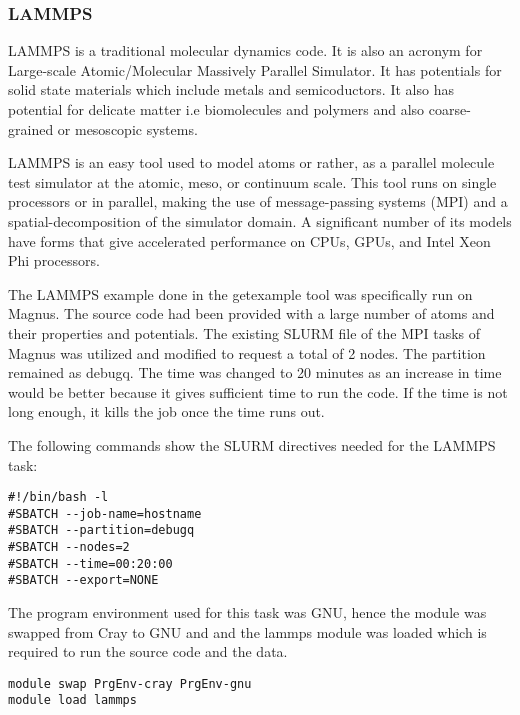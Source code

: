 \subsubsection{LAMMPS}

LAMMPS is a traditional molecular dynamics code. It is also an acronym for Large-scale Atomic/Molecular Massively Parallel Simulator. It has potentials
for solid state materials which include metals and semicoductors. It also has potential for delicate matter i.e biomolecules and polymers and also
coarse-grained or mesoscopic systems.

LAMMPS is an easy tool used to model atoms or rather, as a parallel molecule test simulator at the atomic, meso, or continuum scale. This tool runs on
single processors or in parallel, making the use of message-passing systems (MPI) and a spatial-decomposition of the simulator domain. A significant
number of its models have forms that give accelerated performance on CPUs, GPUs, and Intel Xeon Phi processors.

The LAMMPS example done in the getexample tool was specifically run on Magnus. The source code had been provided with a large number of atoms and their
properties and potentials. The existing SLURM file of the MPI tasks of Magnus was utilized and modified to request a total of 2 nodes. The partition
remained as debugq. The time was changed to 20 minutes as an increase in time would be better because it gives sufficient time to run the code. If the 
time is not long enough, it kills the job once the time runs out.

The following commands show the SLURM directives needed for the LAMMPS task:

\begin{tcolorbox}
\begin{Verbatim}[fontsize=\scriptsize]
#!/bin/bash -l
#SBATCH --job-name=hostname
#SBATCH --partition=debugq
#SBATCH --nodes=2
#SBATCH --time=00:20:00
#SBATCH --export=NONE
\end{Verbatim}
\end{tcolorbox}

The program environment used for this task was GNU, hence the module was swapped from Cray to GNU and and the lammps module was loaded which is required
to run the source code and the data.

\begin{tcolorbox}
\begin{Verbatim}[fontsize=\scriptsize]
module swap PrgEnv-cray PrgEnv-gnu
module load lammps
\end{Verbatim}
\end{tcolorbox}

